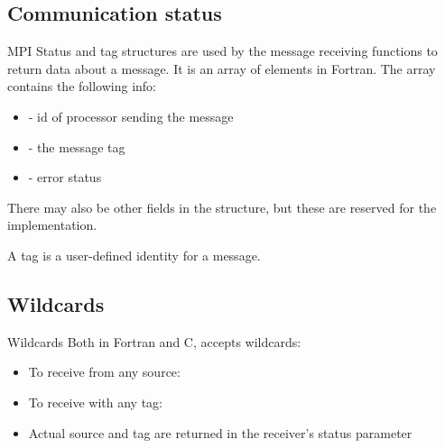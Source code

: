 \documentclass[aspectratio=43]{beamer}
\begin{document}
\subsection{Communication status}
\begin{frame}[fragile]{MPI Status and tag}
\justifying
{} structures are used by the message receiving functions to return data about a message.
It is an  array of  elements in Fortran.
The array contains the following info:
\begin{itemize}
\item {} - id of processor sending the message
\item {} - the message tag
\item {} - error status
\end{itemize}
There may also be other fields in the structure, but these are reserved for the implementation.

A tag is a user-defined identity for a message.

\end{frame}

\subsection{Wildcards}
\begin{frame}[fragile]{Wildcards}
    Both in Fortran and C,   accepts wildcards:
\begin{itemize}
    \item To receive from any source: 
    \item To receive with any tag: 
\item Actual source and tag are returned in the receiver’s status parameter
\end{itemize}
\end{frame}
\end{document}
